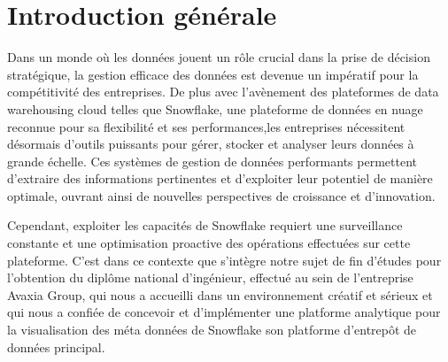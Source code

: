 \chapter*{Introduction générale}

\par Dans un monde où les données jouent un rôle crucial dans la prise de décision stratégique, 
la gestion efficace des données est devenue un impératif pour la compétitivité des entreprises.
De plus avec l'avènement des plateformes de data warehousing cloud telles que Snowflake, une plateforme de 
données en nuage reconnue pour sa flexibilité et ses performances,les entreprises nécessitent désormais d'outils puissants pour gérer,
stocker et analyser leurs données à grande échelle. Ces systèmes de gestion de données performants permettent d'extraire 
des informations pertinentes et d'exploiter leur potentiel de manière optimale, ouvrant ainsi de nouvelles perspectives de croissance et d'innovation.
\par Cependant, exploiter les capacités de Snowflake requiert une surveillance constante et une optimisation 
proactive des opérations effectuées sur cette plateforme. C'est dans ce contexte que s'intègre notre sujet de fin d'études 
pour l'obtention du diplôme national d'ingénieur, effectué au sein de l'entreprise Avaxia Group, qui nous a accueilli dans
un environnement créatif et sérieux et qui nous a confiée de concevoir et d'implémenter une platforme analytique pour la 
visualisation des méta données de Snowflake son platforme d'entrepôt de données principal.

